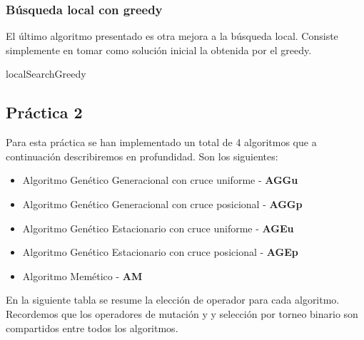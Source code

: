 \documentclass[11pt,a4paper]{article}
\begin{document}
	\subsubsection{Búsqueda local con greedy}
	
	El último algoritmo presentado es otra mejora a la búsqueda local. Consiste simplemente en tomar como solución inicial la obtenida por el greedy. 
	
	\begin{algorithm}[H]
	\caption{localSearchGreedy}
	\end{algorithm}

	\subsection{Práctica 2} \label{sec42}
	
	Para esta práctica se han implementado un total de 4 algoritmos que a continuación describiremos en profundidad. Son los siguientes:
	\begin{itemize}
		\item Algoritmo Genético Generacional con cruce uniforme - \textbf{AGGu}
		\item Algoritmo Genético Generacional con cruce posicional - \textbf{AGGp}
		\item Algoritmo Genético Estacionario con cruce uniforme - \textbf{AGEu}
		\item Algoritmo Genético Estacionario con cruce posicional - \textbf{AGEp}
		\item Algoritmo Memético - \textbf{AM}
	\end{itemize}

	En la siguiente tabla se resume la elección de operador para cada algoritmo. Recordemos que los operadores de mutación y y selección por torneo binario son compartidos entre todos los algoritmos.
	
\end{document}
